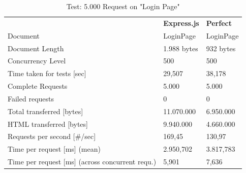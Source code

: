 \begin{table}[H]
\begin{center}
\begin{tabular}{p{8cm}p{2.5cm}p{2.5cm}}
\rowcolor{gray20}														& \textbf{Express.js}	  		& \textbf{Perfect}		\\ 
\rowcolor{gray5}		Document 											& LoginPage					& LoginPage			\\ 
\rowcolor{gray20}	Document Length										& 1.988 bytes				& 932 bytes			\\ 
\rowcolor{gray5}		Concurrency Level									& 500						& 500				\\ 
\rowcolor{gray20}	Time taken for tests [sec]								& 29,507					& 38,178			\\ 
\rowcolor{gray5}		Complete Requests									& 5.000						& 5.000				\\
\rowcolor{gray20}	Failed requests										& 0							& 0					\\ 
\rowcolor{gray5}		Total transferred [bytes]								& 11.070.000				& 6.950.000 			\\ 
\rowcolor{gray20}	HTML transferred	[bytes]								& 9.940.000					& 4.660.000			\\ 
\rowcolor{gray5}		Requests per second [\#/sec]							& 169,45					& 130,97			\\ 
\rowcolor{gray20}	Time per request [ms]	 (mean)							& 2.950,702					& 3.817,783			\\
\rowcolor{gray5}		Time per request [ms]	 (across concurrent requ.)			& 5,901						& 7,636				\\ 
\end{tabular}
\caption{Test: 5.000 Request on "Login Page"} \label{tab:fivethousandrequests}
\end{center}
\end{table}

